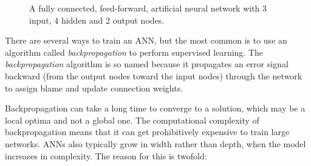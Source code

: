 \documentclass[11pt]{article}
\begin{document}
\begin{figure}[htb]
  \centering
  \scalebox{0.6}
  {
  }
  \caption{A fully connected, feed-forward, artificial neural network with 3 input, 4 hidden and 2 output nodes.}
  \label{fig:ann}
\end{figure}

There are several ways to train an ANN, but the most common is to use an algorithm called \textit{backpropagation} to perform supervised learning.  The \textit{backpropagation} algorithm is so named because it propagates an error signal backward (from the output nodes toward the input nodes) through the network to assign blame and update connection weights.

Backpropagation can take a long time to converge to a solution, which may be a local optima and not a global one.  The computational complexity of backpropagation means that it can get prohibitively expensive to train large networks.  ANNs also typically grow in width rather than depth, when the model increases in complexity.  The reason for this is twofold:
\end{document}
